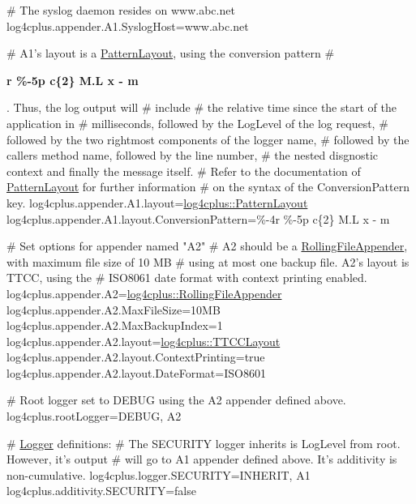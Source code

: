 \begin{DoxyPre}\# The syslog daemon resides on www.abc.net
log4cplus.appender.A1.SyslogHost=www.abc.net\end{DoxyPre}



\begin{DoxyPre}\# A1's layout is a \hyperlink{classlog4cplus_1_1PatternLayout}{PatternLayout}, using the conversion pattern
\# {\bfseries r \%-5p c\{2\} M.L x - m\par
}. Thus, the log output will
\# include \# the relative time since the start of the application in
\# milliseconds, followed by the LogLevel of the log request,
\# followed by the two rightmost components of the logger name,
\# followed by the callers method name, followed by the line number,
\# the nested disgnostic context and finally the message itself.
\# Refer to the documentation of \hyperlink{classlog4cplus_1_1PatternLayout}{PatternLayout} for further information
\# on the syntax of the ConversionPattern key.
log4cplus.appender.A1.layout=\hyperlink{classlog4cplus_1_1PatternLayout}{log4cplus::PatternLayout}
log4cplus.appender.A1.layout.ConversionPattern=\%-4r \%-5p c\{2\} M.L x - m\par

\# Set options for appender named "A2"
\# A2 should be a \hyperlink{classlog4cplus_1_1RollingFileAppender}{RollingFileAppender}, with maximum file size of 10 MB
\# using at most one backup file. A2's layout is TTCC, using the
\# ISO8061 date format with context printing enabled.
log4cplus.appender.A2=\hyperlink{classlog4cplus_1_1RollingFileAppender}{log4cplus::RollingFileAppender}
log4cplus.appender.A2.MaxFileSize=10MB
log4cplus.appender.A2.MaxBackupIndex=1
log4cplus.appender.A2.layout=\hyperlink{classlog4cplus_1_1TTCCLayout}{log4cplus::TTCCLayout}
log4cplus.appender.A2.layout.ContextPrinting=true
log4cplus.appender.A2.layout.DateFormat=ISO8601\end{DoxyPre}



\begin{DoxyPre}\# Root logger set to DEBUG using the A2 appender defined above.
log4cplus.rootLogger=DEBUG, A2\end{DoxyPre}



\begin{DoxyPre}\# \hyperlink{classlog4cplus_1_1Logger}{Logger} definitions:
\# The SECURITY logger inherits is LogLevel from root. However, it's output
\# will go to A1 appender defined above. It's additivity is non-cumulative.
log4cplus.logger.SECURITY=INHERIT, A1
log4cplus.additivity.SECURITY=false\end{DoxyPre}



